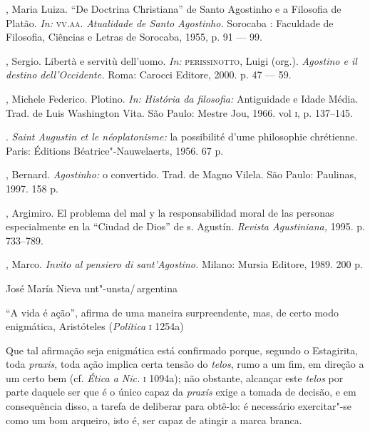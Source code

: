 \begin{description}
 , Maria
Luiza. “De Doctrina  Christiana” de Santo Agostinho e a
Filosofia de Platão. \emph{In:} \textsc{vv}.\textsc{aa}. \emph{Atualidade de
Santo Agostinho}\emph{.} Sorocaba : Faculdade de Filosofia,
Ciências e Letras de Sorocaba, 1955, p. 91 --- 99.


,
Sergio. Libertà e servitù dell'uomo. \emph{In:}
\textsc{perissinotto},
Luigi (org.). \emph{Agostino e il destino
dell'Occidente.}  Roma: Carocci Editore, 2000. p. 47 ---
59.

 , Michele Federico.  Plotino. \emph{In:}
\emph{História da filosofia}\emph{:} Antiguidade  e Idade
Média. Trad. de Luis Washington Vita.  São Paulo: Mestre Jou,
1966. vol \textsc{i}, p. 137--145.

 \titidem. \emph{Saint
Augustin et le néoplatonisme}\emph{:} la possibilité d'ume
philosophie chrétienne. Paris: Éditions Béatrice"-Nauwelaerts,
1956. 67 p.

 , Bernard. \emph{Agostinho}\emph{:} o
convertido. Trad. de Magno Vilela. São Paulo: Paulinas, 1997.
158 p.

 , Argimiro.  El problema del  mal y  la
responsabilidad moral de las personas  especialmente  en  la
“Ciudad de  Dios” de  s. Agustín. \emph{Revista
Agustiniana}\emph{,} 1995. p. 733--789.

 , Marco.
\emph{Invito al pensiero di sant'Agostino}\emph{.} Milano:
Mursia Editore, 1989. 200 p.

\end{description}


%
	 {José María Nieva}%
 	 {unt"-unsta/\,argentina}



``A vida é ação'', afirma de uma maneira surpreendente, mas, de certo
modo enigmática, Aristóteles (\textit{Política} \textsc{i} 1254a) 

Que tal afirmação seja enigmática está confirmado porque, segundo o 
Estagirita, toda \textit{praxis}, toda ação implica certa tensão do \textit{telos}, rumo a um fim, 
em direção a um certo bem (cf. \textit{Ética a Nic.} \textsc{i} 1094a); não obstante, 
alcançar este \textit{telos} por parte daquele ser que é o único capaz da
\textit{praxis} exige a tomada de decisão, e em consequência disso, a tarefa 
de deliberar para obtê-lo: é necessário exercitar"-se como um bom arqueiro, 
isto é, ser capaz de atingir a marca branca.

